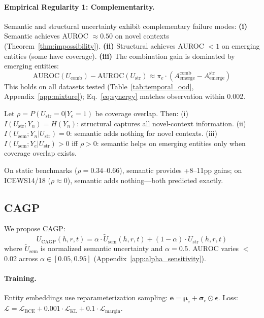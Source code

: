 \paragraph{Empirical Regularity 1: Complementarity.}
\label{reg:complementarity}
Semantic and structural uncertainty exhibit complementary failure modes:
\textbf{(i)} Semantic achieves AUROC $\approx 0.50$ on novel contexts (Theorem~\ref{thm:impossibility}).
\textbf{(ii)} Structural achieves AUROC $< 1$ on emerging entities (some have coverage).
\textbf{(iii)} The combination gain is dominated by emerging entities:
\begin{equation}
\text{AUROC}(U_{\text{comb}}) - \text{AUROC}(U_{\text{str}}) \approx \pi_e \cdot \left(A_{\text{emerge}}^{\text{comb}}-A_{\text{emerge}}^{\text{str}}\right)
\label{eq:synergy}
\end{equation}
This holds on all datasets tested (Table~\ref{tab:temporal_ood}, Appendix~\ref{app:mixture}); Eq.~\ref{eq:synergy} matches observation within 0.002.

\begin{theorem}
\label{thm:info_decomp}
Let $\rho = P(U_{\text{str}} = 0 | Y_e = 1)$ be coverage overlap. Then:
(i) $I(U_{\text{str}}; Y_n) = H(Y_n)$: structural captures all novel-context information.
(ii) $I(U_{\text{sem}}; Y_n | U_{\text{str}}) = 0$: semantic adds nothing for novel contexts.
(iii) $I(U_{\text{sem}}; Y_e | U_{\text{str}}) > 0$ iff $\rho > 0$: semantic helps on emerging entities only when coverage overlap exists.
\end{theorem}

On static benchmarks ($\rho = 0.34$--$0.66$), semantic provides +8--11pp gains; on ICEWS14/18 ($\rho \approx 0$), semantic adds nothing---both predicted exactly.

\subsection{CAGP}
\label{sec:cagp}

We propose CAGP:
\begin{equation}
    U_{\text{CAGP}}(h,r,t) = \alpha \cdot \tilde{U}_{\text{sem}}(h,r,t) + (1-\alpha) \cdot U_{\text{str}}(h,r,t)
    \label{eq:cagp}
\end{equation}
where $\tilde{U}_{\text{sem}}$ is normalized semantic uncertainty and $\alpha{=}0.5$. AUROC varies $<$0.02 across $\alpha \in [0.05, 0.95]$ (Appendix~\ref{app:alpha_sensitivity}).

\paragraph{Training.}
Entity embeddings use reparameterization sampling: $\mathbf{e} = \boldsymbol{\mu}_e + \boldsymbol{\sigma}_e \odot \boldsymbol{\epsilon}$. Loss: $\mathcal{L} = \mathcal{L}_{\text{BCE}} + 0.001 \cdot \mathcal{L}_{\text{KL}} + 0.1 \cdot \mathcal{L}_{\text{margin}}$.


